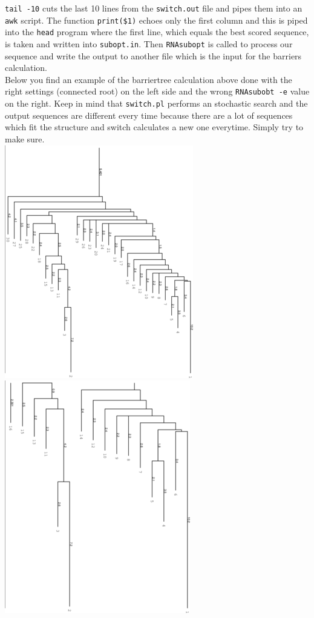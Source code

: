 \documentclass[]{article}
\begin{document}
\texttt{tail\ -10} cuts the last 10 lines from the \texttt{switch.out}
file and pipes them into an \texttt{awk} script. The function
\texttt{print(\$1)} echoes only the first column and this is piped into
the \texttt{head} program where the first line, which equals the best
scored sequence, is taken and written into \texttt{subopt.in}. Then
\texttt{RNAsubopt} is called to process our sequence and write the
output to another file which is the input for the barriers calculation.\\
 Below you find an example of the barriertree calculation above done with
the right settings (connected root) on the left side and the wrong
\texttt{RNAsubobt\ -e} value on the right. Keep in mind that
\texttt{switch.pl} performs an stochastic search and the output
sequences are different every time because there are a lot of sequences
which fit the structure and switch calculates a new one everytime. Simply
try to make sure.\\
 \includegraphics{Figs/switch_barriertree.png}
\includegraphics{Figs/switch_barriertree_e13.png}
\end{document}
